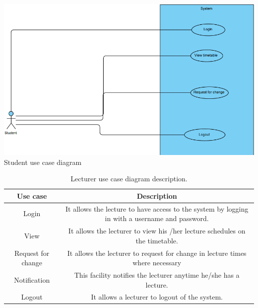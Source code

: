 \documentclass{scrreprt}
\begin{document}
 \begin{center}
\includegraphics[scale=0.6]{student.png}
Student use case diagram
\end{center}

\begin{table}[h!]
  \begin{center}
    \caption{Lecturer use case diagram description.}
    \label{tab:table1}
    \begin{tabular}{|c|c|} 
\hline
      \textbf{Use case} & \textbf{Description} \\
 
      \hline
     Login& It allows the lecture to have access to the system by logging in with a username and password. \\
\hline
      View  &  It allows the lecturer to view his /her lecture schedules on the  timetable.\\
\hline
       Request for change& It allows the lecturer to request for change in lecture times  where necessary\\
\hline
Notification&This facility notifies the lecturer anytime he/she has a lecture.\\
\hline
Logout&  It allows a lecturer to logout of the system.\\
\hline
  \end{tabular}
  \end{center}
\end{table}
\end{document}
